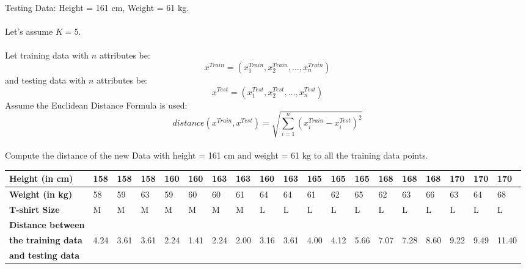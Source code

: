 \documentclass{book}
\begin{document}
Testing Data: Height = 161 cm, Weight = 61 kg.\\
\vspace{2mm}
\\
Let's assume \(K = 5\).\\
\vspace{2mm}
\\
Let training data with \(n\) attributes be:
\[
    x^{Train} = (x_1^{Train}, x_2^{Train}, \ldots, x_n^{Train})
\]
and testing data with \(n\) attributes be:
\[
    x^{Test} = (x_1^{Test}, x_2^{Test}, \ldots, x_n^{Test})
\]
Assume the Euclidean Distance Formula is used:
\[
    distance(x^{Train}, x^{Test}) = \sqrt{\sum_{i=1}^{n} (x_i^{Train} - x_i^{Test})^2}
\]
\newpage
{}\\
Compute the distance of the new Data with height = 161 cm and weight = 61 kg to all the training data points.\\
\begin{center}
    \begin{tabular}{|m{3cm}|m{0.5cm}|m{0.5cm}|m{0.5cm}|m{0.5cm}|m{0.5cm}|m{0.5cm}|m{0.5cm}|m{0.5cm}|m{0.5cm}|m{0.5cm}|m{0.5cm}|m{0.5cm}|m{0.5cm}|m{0.5cm}|m{0.5cm}|m{0.5cm}|m{0.5cm}|m{0.7cm}|}
        \hline
        \textbf{Height (in cm)} & 158 & 158 & 158 & 160 & 160 & 163 & 163 & 160 & 163 & 165 & 165 & 165 & 168 & 168 & 168 & 170 & 170 & 170 \\
        \hline
        \textbf{Weight (in kg)} & 58 & 59 & 63 & 59 & 60 & 60 & 61 & 64 & 64 & 61 & 62 & 65 & 62 & 63 & 66 & 63 & 64 & 68 \\
        \hline
        \textbf{T-shirt Size} & M & M & M & M & M & M & M & L & L & L & L & L & L & L & L & L & L & L \\
        \hline
        \textbf{Distance between} & & & & & & & & & & & & & & & & & & \\
        \textbf{the training data} & \scriptsize{4.24} & \scriptsize{3.61} & \scriptsize{3.61} & \scriptsize{2.24} & \scriptsize{1.41} & \scriptsize{2.24} & \scriptsize{2.00} & \scriptsize{3.16} & \scriptsize{3.61} & \scriptsize{4.00} & \scriptsize{4.12} & \scriptsize{5.66} & \scriptsize{7.07} & \scriptsize{7.28} & \scriptsize{8.60} & \scriptsize{9.22} & \scriptsize{9.49} & \scriptsize{11.40} \\
        \textbf{and testing data} & & & & & & & & & & & & & & & & & & \\
        \hline
        \end{tabular}
\end{center}
\end{document}
